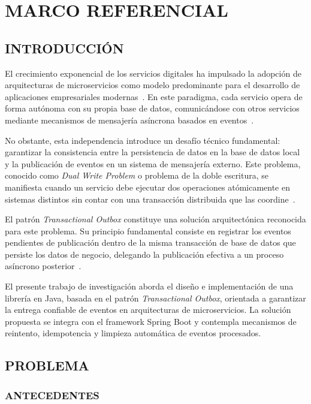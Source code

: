 \chapter{MARCO REFERENCIAL}

\section{INTRODUCCIÓN}

El crecimiento exponencial de los servicios digitales ha impulsado la adopción de arquitecturas de microservicios como modelo predominante para el desarrollo de aplicaciones empresariales modernas~\parencite{newman2015}. En este paradigma, cada servicio opera de forma autónoma con su propia base de datos, comunicándose con otros servicios mediante mecanismos de mensajería asíncrona basados en eventos~\parencite{richardson2018}.

No obstante, esta independencia introduce un desafío técnico fundamental: garantizar la consistencia entre la persistencia de datos en la base de datos local y la publicación de eventos en un sistema de mensajería externo. Este problema, conocido como \textit{Dual Write Problem} o problema de la doble escritura, se manifiesta cuando un servicio debe ejecutar dos operaciones atómicamente en sistemas distintos sin contar con una transacción distribuida que las coordine~\parencite{kleppmann2017}.

El patrón \textit{Transactional Outbox} constituye una solución arquitectónica reconocida para este problema. Su principio fundamental consiste en registrar los eventos pendientes de publicación dentro de la misma transacción de base de datos que persiste los datos de negocio, delegando la publicación efectiva a un proceso asíncrono posterior~\parencite{richardson2018}.

El presente trabajo de investigación aborda el diseño e implementación de una librería en Java, basada en el patrón \textit{Transactional Outbox}, orientada a garantizar la entrega confiable de eventos en arquitecturas de microservicios. La solución propuesta se integra con el framework Spring Boot y contempla mecanismos de reintento, idempotencia y limpieza automática de eventos procesados.

\section{PROBLEMA}

\subsection{ANTECEDENTES}

